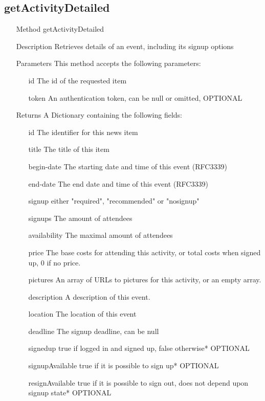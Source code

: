 \documentclass[a4paper]{scrreprt}
\begin{document}
\subsection{getActivityDetailed}
\begin{enumerate}
\item[Method] getActivityDetailed
\item[Description] Retrieves details of an event, including its signup options
\item[Parameters] This method accepts the following parameters:
	\begin{enumerate}
    	\item[id] The id of the requested item
    	\item[token] An authentication token, can be null or omitted, OPTIONAL
    \end{enumerate}
\item[Returns] A Dictionary containing the following fields:
\begin{enumerate}
    \item[id] The identifier for this news item
    \item[title] The title of this item
    \item[begin-date] The starting date and time of this event (RFC3339)
    \item[end-date] The end date and time of this event (RFC3339)
    \item[signup] either "required", "recommended" or "nosignup"
    \item[signups] The amount of attendees
    \item[availability] The maximal amount of attendees
    \item[price] The base costs for attending this activity, or total costs  when signed up, 0 if no price.
    \item[pictures] An array of URLs to pictures for this activity, or an empty array.
    \item[description] A description of this event.
    \item[location] The location of this event
    \item[deadline] The signup deadline, can be null
    \item[signedup] true if logged in and signed up, false otherwise* OPTIONAL
    \item[signupAvailable] true if it is possible to sign up* OPTIONAL
    \item[resignAvailable] true if it is possible to sign out, does not depend upon signup state* OPTIONAL

\end{enumerate}
\end{enumerate}
\end{document}
